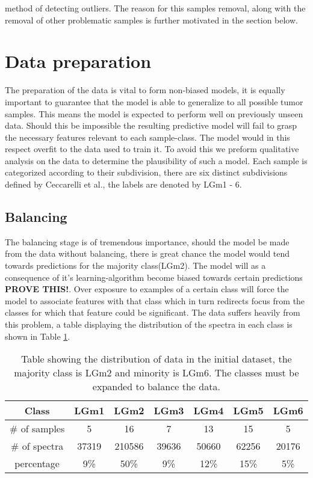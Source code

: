method of detecting outliers. The reason for this samples removal, along with the removal of other problematic samples is further motivated in the section below.

\section{Data preparation}
The preparation of the data is vital to form non-biased models, it is equally important to guarantee that the model is able to generalize to all possible tumor samples. This means the model is expected to perform well on previously unseen data. Should this be impossible the resulting predictive model will fail to grasp the necessary features relevant to each sample-class. The model would in this respect overfit to the data used to train it. To avoid this we preform qualitative analysis on the data to determine the plausibility of such a model. Each sample is categorized according to their subdivision, there are six distinct subdivisions defined by Ceccarelli et al.\cite{cellsubsets}, the labels are denoted by LGm1 - 6.

\subsection{Balancing}
The balancing stage is of tremendous importance, should the model be made from the data without balancing, there is great chance the model would tend towards predictions for the majority class(LGm2). The model will as a consequence of it's learning-algorithm become biased towards certain predictions \textbf{PROVE THIS!}. Over exposure to examples of a certain class will force the model to associate features with that class which in turn redirects focus from the classes for which that feature could be significant. The data suffers heavily from this problem, a table displaying the distribution of the spectra in each class is shown in Table \ref{table:1}.
\\

\begin{table}[h!]
\centering
 \begin{tabular}{||c c c c c c c||} 
 \hline
 Class & LGm1 & LGm2 & LGm3 & LGm4 & LGm5 & LGm6 \\ [0.5ex] 
 \hline\hline
 \# of samples & 5& 16 & 7 & 13 & 15 & 5 \\ 
 \hline
 \# of spectra & 37319 & 210586 & 39636 & 50660 & 62256 & 20176 \\
 \hline
 percentage & 9\%& 50\% & 9\% & 12\% & 15\% & 5\% \\
 \hline

\end{tabular}
\caption{Table showing the distribution of data in the initial dataset, the majority class is LGm2 and minority is LGm6. The classes must be expanded to balance the data.}
\label{table:1}
\end{table}

